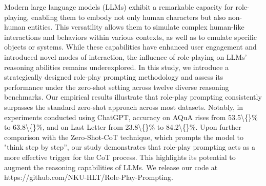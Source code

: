 Modern large language models (LLMs) exhibit a remarkable capacity for role-playing, enabling them to embody not only human characters but also non-human entities. This versatility allows them to simulate complex human-like interactions and behaviors within various contexts, as well as to emulate specific objects or systems. While these capabilities have enhanced user engagement and introduced novel modes of interaction, the influence of role-playing on LLMs' reasoning abilities remains underexplored. In this study, we introduce a strategically designed role-play prompting methodology and assess its performance under the zero-shot setting across twelve diverse reasoning benchmarks. Our empirical results illustrate that role-play prompting consistently surpasses the standard zero-shot approach across most datasets. Notably, in experiments conducted using ChatGPT, accuracy on AQuA rises from 53.5\textbackslash\{\}\% to 63.8\textbackslash\{\}\%, and on Last Letter from 23.8\textbackslash\{\}\% to 84.2\textbackslash\{\}\%. Upon further comparison with the Zero-Shot-CoT technique, which prompts the model to "think step by step'', our study demonstrates that role-play prompting acts as a more effective trigger for the CoT process. This highlights its potential to augment the reasoning capabilities of LLMs. We release our code at https://github.com/NKU-HLT/Role-Play-Prompting.